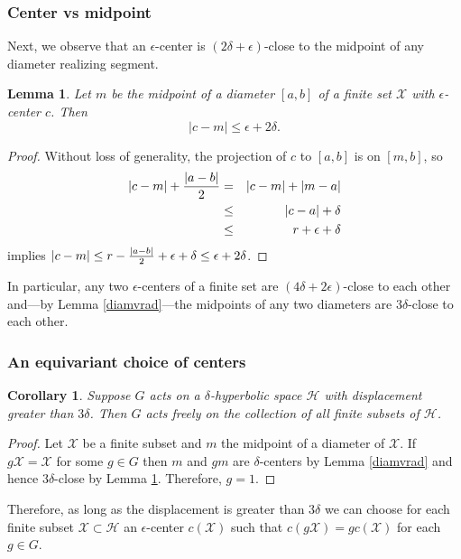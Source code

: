 \documentclass[11pt,letterpaper]{amsart}
\newtheorem{lemma}[theorem]{Lemma}
\newtheorem{corollary}[theorem]{Corollary}
\begin{document}
\subsubsection*{Center vs midpoint}
Next, we observe that an $\epsilon$-center is $(2\delta+\epsilon)$-close to the midpoint of any diameter realizing segment.
\begin{lemma}
\label{centervsmidpoint}
Let $m$ be the midpoint of a diameter $[a,b]$ of a finite set $\mathcal X$ with $\epsilon$-center $c$. Then 
$$
|c-m|\leq \epsilon+2\delta.
$$  
\end{lemma}
\begin{proof}
Without loss of generality, the projection of $c$ to $[a,b]$ is on $[m,b]$, so
\begin{eqnarray*}
|c-m|+{|a-b|\over 2}&=&|c-m|+|m-a|\\
&\leq&|c-a|+\delta\\
&\leq&r+\epsilon+\delta
\end{eqnarray*} 
implies $|c-m|\leq r-{|a-b|\over 2}+\epsilon+\delta\leq\epsilon+ 2\delta$. 
\end{proof}
In particular, any two $\epsilon$-centers of a finite set are $(4\delta+2\epsilon)$-close to each other and---by Lemma \ref{diamvrad}---the midpoints of any two diameters are $3\delta$-close to each other.

\subsubsection*{An equivariant choice of centers}
\begin{corollary}
\label{equivcenter}
Suppose $G$ acts on a $\delta$-hyperbolic space $\mathcal H$ with displacement greater than $3\delta$. Then $G$ acts freely on the collection of all finite subsets of $\mathcal H$. 
\end{corollary}
\begin{proof}
Let $\mathcal X$ be a finite subset and $m$ the midpoint of a diameter of $\mathcal X$. If $g\mathcal X=\mathcal X$ for some $g\in G$ then $m$ and $gm$ are $\delta$-centers by Lemma \ref{diamvrad} and hence $3\delta$-close by Lemma \ref{centervsmidpoint}. Therefore, $g=1$. 
\end{proof}
Therefore, as long as the displacement is greater than $3\delta$ we can choose for each finite subset $\mathcal X\subset \mathcal H$ an $\epsilon$-center $c(\mathcal X)$ such that $c(g\mathcal X)=gc(\mathcal X)$ for each $g\in G$.  
\end{document}
